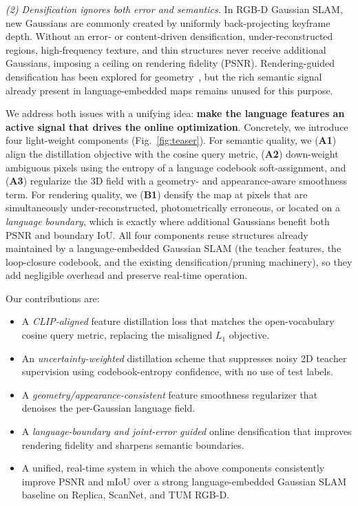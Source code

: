 \documentclass[10pt, journal]{IEEEtran}
\begin{document}
\textit{(2) Densification ignores both error and semantics.} In RGB-D Gaussian
SLAM, new Gaussians are commonly created by uniformly back-projecting keyframe
depth. Without an error- or content-driven densification, under-reconstructed
regions, high-frequency texture, and thin structures never receive additional
Gaussians, imposing a ceiling on rendering fidelity (PSNR). Rendering-guided
densification has been explored for geometry~\cite{wu2024highfidelity}, but the
rich semantic signal already present in language-embedded maps remains unused for
this purpose.

We address both issues with a unifying idea: \textbf{make the language features an
active signal that drives the online optimization}. Concretely, we introduce four
light-weight components (Fig.~\ref{fig:teaser}). For semantic quality, we
(\textbf{A1}) align the distillation objective with the cosine query metric,
(\textbf{A2}) down-weight ambiguous pixels using the entropy of a language
codebook soft-assignment, and (\textbf{A3}) regularize the 3D field with a
geometry- and appearance-aware smoothness term. For rendering quality, we
(\textbf{B1}) densify the map at pixels that are simultaneously
under-reconstructed, photometrically erroneous, or located on a \emph{language
boundary}, which is exactly where additional Gaussians benefit both PSNR and
boundary IoU. All four components reuse structures already maintained by a
language-embedded Gaussian SLAM (the teacher features, the loop-closure codebook,
and the existing densification/pruning machinery), so they add negligible
overhead and preserve real-time operation.

Our contributions are:
\begin{itemize}
  \item A \emph{CLIP-aligned} feature distillation loss that matches the
  open-vocabulary cosine query metric, replacing the misaligned $L_1$ objective.
  \item An \emph{uncertainty-weighted} distillation scheme that suppresses noisy
  2D teacher supervision using codebook-entropy confidence, with no use of test
  labels.
  \item A \emph{geometry/appearance-consistent} feature smoothness regularizer
  that denoises the per-Gaussian language field.
  \item A \emph{language-boundary and joint-error guided} online densification
  that improves rendering fidelity and sharpens semantic boundaries.
  \item A unified, real-time system in which the above components consistently
  improve PSNR and mIoU over a strong language-embedded Gaussian SLAM baseline on
  Replica, ScanNet, and TUM RGB-D.
\end{itemize}
\end{document}
